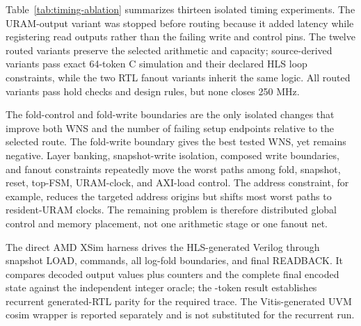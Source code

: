 \documentclass[conference]{IEEEtran}
\begin{document}
Table~\ref{tab:timing-ablation} summarizes thirteen isolated timing
experiments. The URAM-output variant was stopped before routing because it
added latency while registering read outputs rather than the failing write and
control pins. The twelve routed variants preserve the selected arithmetic and
capacity; source-derived variants pass exact 64-token C simulation and their
declared HLS loop constraints, while the two RTL fanout variants inherit the
same logic. All routed variants pass hold checks and design rules, but none
closes 250 MHz.

The fold-control and fold-write boundaries are the only isolated changes that
improve both WNS and the number of failing setup endpoints relative to the
selected route. The fold-write boundary gives the best tested WNS, yet remains
negative. Layer banking, snapshot-write isolation, composed write boundaries,
and fanout constraints repeatedly move the worst paths among fold, snapshot,
reset, top-FSM, URAM-clock, and AXI-load control. The address constraint, for
example, reduces the targeted address origins but shifts most worst paths to
resident-URAM clocks. The remaining problem is therefore distributed global
control and memory placement, not one arithmetic stage or one fanout net.

\begin{table}[t]
\centering
\caption{Selected 4.0 ns route and thirteen isolated timing experiments. WNS
and failing-endpoint counts are from matched out-of-context routes; the one
HLS-only row was rejected before route. No experiment is promoted.}
\label{tab:timing-ablation}
\scriptsize
\resizebox{\textwidth}{!}{}
\end{table}

\begin{table}[t]
\centering
\caption{Matched out-of-context physical results. Power is vectorless; each
frequency is the first passing point in the tested fixed-route sweep.}
\label{tab:postroute}
\scriptsize
\resizebox{\columnwidth}{!}{}
\end{table}

The direct AMD XSim harness drives the HLS-generated Verilog through snapshot
LOAD, \RsTwoRtlTransactions{} commands, all log-fold boundaries, and final
READBACK. It compares \RsTwoRtlOutputs{} decoded output values plus counters and
the complete final encoded state against the independent integer oracle; the
\RsTwoRtlTokens{}-token \RsTwoRtlStatus{} result establishes recurrent
generated-RTL parity for the required trace. The Vitis-generated UVM cosim
wrapper is reported separately and is not substituted for the recurrent run.
\end{document}

